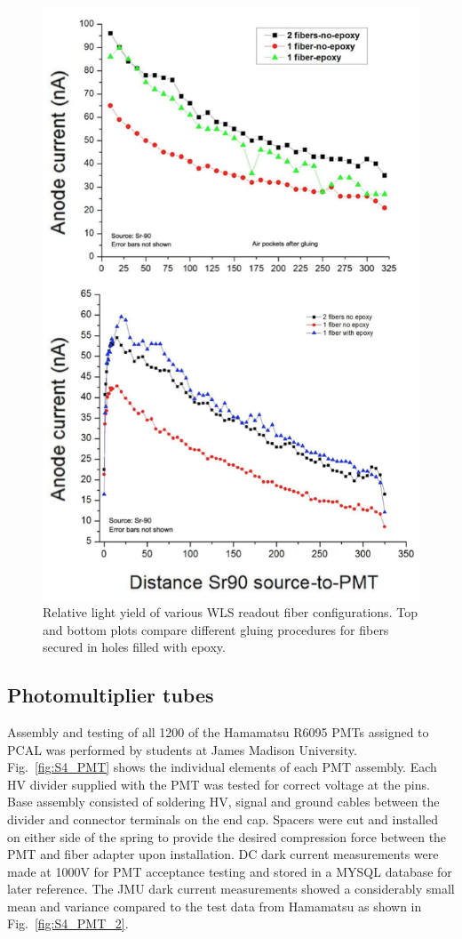 \begin{figure}[hbt]
\centering
\includegraphics[width=0.85\columnwidth,keepaspectratio]{img/S4_4.png}
\caption{Relative light yield of various WLS readout fiber configurations.  Top and bottom plots compare different gluing procedures for fibers secured in holes filled with epoxy.}
\label{fig:S4_4}
\end{figure}

\subsection{Photomultiplier tubes}
Assembly and testing of all 1200 of the Hamamatsu R6095 PMTs assigned to PCAL was performed by students at James Madison University. Fig.~\ref{fig:S4_PMT} shows the individual elements of each PMT assembly. Each HV divider supplied with the PMT was tested for correct voltage at the pins.   Base assembly consisted of soldering HV, signal and ground cables between the divider and connector terminals on the end cap.  Spacers were cut and installed on either side of the spring to provide the desired compression force between the PMT and fiber adapter upon installation.  DC dark current measurements were made at 1000V for PMT acceptance testing and stored in a MYSQL database for later reference.  The  JMU dark current measurements showed a considerably small mean and variance compared to the test data from Hamamatsu as shown in Fig.~\ref{fig:S4_PMT_2}. 

